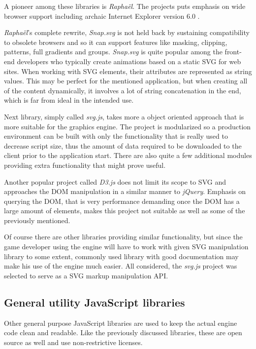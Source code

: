 \documentclass[11pt,oneside, final]{fithesis2}
\begin{document}
A pioneer among these libraries is \emph{Raphaël}. The projects puts emphasis on wide browser support including archaic Internet Explorer version 6.0 \cite{raphael}.

\emph{Raphaël}'s complete rewrite, \emph{Snap.svg} is not held back by sustaining compatibility to obsolete browsers and so it can support features like masking, clipping, patterns, full gradients and groups\cite{snap}. \emph{Snap.svg} is quite popular among the front-end developers who typically create animations based on a static SVG for web sites\cite{snapusage}. When working with SVG elements, their attributes are represented as string values. This may be perfect for the mentioned application, but when creating all of the content dynamically, it involves a lot of string concatenation in the end, which is far from ideal in the intended use.

Next library, simply called \emph{svg.js}, takes more a object oriented approach\cite{svgjs} that is more suitable for the graphics engine. The project is modularized so a production environment can be built with only the functionality that is really used to decrease script size, thus the amount of data required to be downloaded to the client prior to the application start. There are also quite a few additional modules providing extra functionality that might prove useful.

Another popular project called \emph{D3.js} does not limit its scope to SVG and approaches the DOM manipulation in a similar manner to \emph{jQuery}\cite{d3js}. Emphasis on querying the DOM, that is very performance demanding once the DOM has a large amount of elements, makes this project not suitable as well as some of the previously mentioned.

Of course there are other libraries providing similar functionality, but since the game developer using the engine will have to work with given SVG manipulation library to some extent, commonly used library with good documentation may make his use of the engine much easier. All considered, the \emph{svg.js} project was selected to serve as a SVG markup manipulation API.

\subsection{General utility JavaScript libraries}
\label{jslibs}
Other general purpose JavaScript libraries are used to keep the actual engine code clean and readable. Like the previously discussed libraries, these are open source as well and use non-restrictive licenses.
\end{document}
